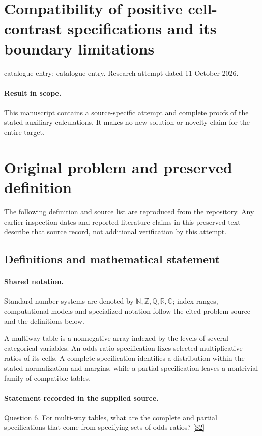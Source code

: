 \documentclass[11pt]{article}
\begin{document}
\section*{Compatibility of positive cell-contrast specifications and its boundary limitations}
\noindent catalogue entry; catalogue entry. Research attempt dated 11 October 2026.
\paragraph{Result in scope.}This manuscript contains a source-specific attempt and complete proofs of the stated auxiliary calculations. It makes no new solution or novelty claim for the entire target.
\section{Original problem and preserved definition}
The following definition and source list are reproduced from the repository. Any earlier inspection dates and reported literature claims in this preserved text describe that source record, not additional verification by this attempt.
\subsection{Definitions and mathematical statement}

\paragraph{Shared notation.}Standard number systems are denoted by $\mathbb N,\mathbb Z,\mathbb Q,\mathbb R,\mathbb C$; index ranges, computational models and specialized notation follow the cited problem source and the definitions below.


A multiway table is a nonnegative array indexed by the levels of several categorical variables. An odds-ratio specification fixes selected multiplicative ratios of its cells. A complete specification identifies a distribution within the stated normalization and margins, while a partial specification leaves a nontrivial family of compatible tables.
\paragraph{Statement recorded in the supplied source.}
Question 6. For multi-way tables, what are the complete and partial specifications that come from specifying sets of odds-ratios? \href{https://aimath.org/WWN/compalgstat/compalgstat.pdf}{[S2]}
\end{document}
